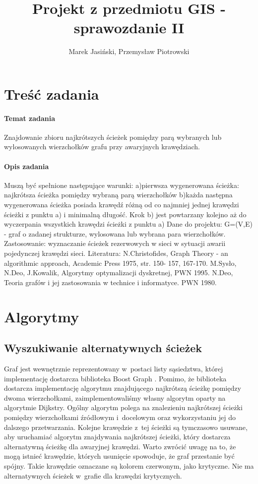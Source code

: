\documentclass[a4paper, 12pt]{article}
\title {Projekt z przedmiotu GIS - sprawozdanie II}
\author{Marek Jasiński, Przemysław Piotrowski}
\begin{document}
\maketitle

\section{Treść zadania}

\paragraph{Temat zadania}
Znajdowanie zbioru najkrótszych ścieżek pomiędzy parą wybranych lub wylosowanych wierzchołków grafu przy awaryjnych krawędziach.

\paragraph{Opis zadania}
Muszą być spełnione następujące warunki: a)pierwsza wygenerowana ścieżka: najkrótsza ścieżka pomiędzy wybraną parą wierzchołków b)każda następna wygenerowana ścieżka posiada krawędź różną od co najmniej jednej krawędzi ścieżki z punktu a) i minimalną długość. Krok b) jest powtarzany kolejno aż do wyczerpania wszystkich krawędzi ścieżki z punktu a) Dane do projektu: G=(V,E) - graf o zadanej strukturze, wylosowana lub wybrana para wierzchołków. Zastosowanie: wyznaczanie ścieżek rezerwowych w sieci w sytuacji awarii pojedynczej krawędzi sieci. Literatura: N.Christofides, Graph Theory - an algorithmic approach, Academic Press 1975, str. 150- 157, 167-170. M.Sysło, N.Deo, J.Kowalik, Algorytmy optymalizacji dyskretnej, PWN 1995. N.Deo, Teoria grafów i jej zastosowania w technice i informatyce. PWN 1980.

\section{Algorytmy}

\subsection{Wyszukiwanie alternatywnych ścieżek}

Graf jest wewnętrznie reprezentowany w~postaci listy sąsiedztwa, której implementację dostarcza biblioteka Boost Graph \cite{bgl}. Pomimo, że biblioteka dostarcza implementację algorytmu znajdującego najkrótszą ścieżkę pomiędzy dwoma wierzchołkami, zaimplementowaliśmy własny algorytm oparty na algorytmie Dijkstry. Ogólny algorytm polega na znalezieniu najkrótszej ścieżki pomiędzy wierzchołkami źródłowym i~docelowym oraz wykorzystaniu jej do dalszego przetwarzania. Kolejne krawędzie z~tej ścieżki są tymczasowo usuwane, aby uruchamiać algorytm znajdywania najkrótszej ścieżki, który dostarcza alternatywną ścieżkę dla awaryjnej krawędzi. Warto zwrócić uwagę na to, że mogą istnieć krawędzie, których usunięcie spowoduje, że graf przestanie być spójny. Takie krawędzie oznaczane są kolorem czerwonym, jako krytyczne. Nie ma alternatywnych ścieżek w~grafie dla krawędzi krytycznych.
\end{document}
